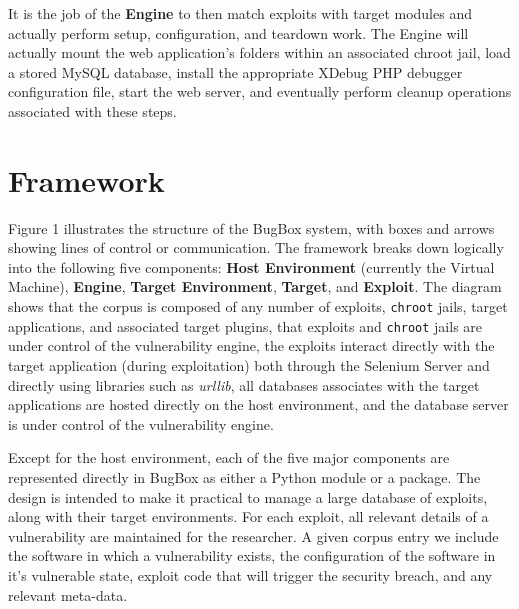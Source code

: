 \documentclass[letterpaper,twocolumn,10pt]{article}
\begin{document}
It is the job of the {\bf Engine} to then match exploits with target modules and actually perform setup, configuration, and teardown work. The Engine will actually mount the web application's folders within an associated chroot jail, load a stored MySQL database, install the appropriate XDebug PHP debugger configuration file, start the web server, and eventually perform cleanup operations associated with these steps.

\section{Framework}

Figure 1 illustrates the structure of the BugBox system, with boxes and arrows showing lines of control or communication. The framework breaks down logically into the following five components: {\bf Host Environment} (currently the Virtual Machine), {\bf Engine}, {\bf Target Environment}, {\bf Target}, and {\bf Exploit}. The diagram shows that the corpus is composed of any number of exploits, {\tt chroot} jails, target applications, and associated target plugins, that exploits and {\tt chroot} jails are under control of the vulnerability engine, the exploits interact directly with the target application (during exploitation) both through the Selenium Server and directly using libraries such as \emph{urllib}, all databases associates with the target applications are hosted directly on the host environment, and the database server is under control of the vulnerability engine.\par
Except for the host environment, each of the five major components are represented directly in BugBox as either a Python module or a package. The design is intended to make it practical to manage a large database of exploits, along with their target environments. For each exploit, all relevant details of a vulnerability are maintained for the researcher. A given corpus entry we include the software in which a vulnerability exists, the configuration of the software in it's vulnerable state, exploit code that will trigger the security breach, and any relevant meta-data.\par
\end{document}
